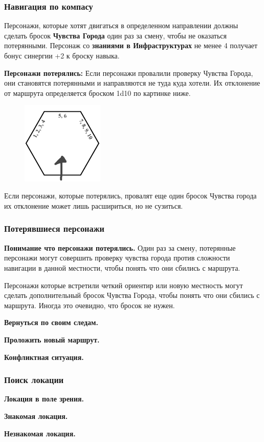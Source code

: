 \subsubsection*{Навигация по компасу}
Персонажи, которые хотят двигаться в определенном направлении должны сделать
бросок \textbf{Чувства Города} один раз за смену, чтобы не оказаться потерянными.
Персонаж со \textbf{знаниями в Инфраструктурах} не менее 4 получает бонус синергии +2 к броску навыка.

\textbf{Персонажи потерялись:} Если персонажи провалили проверку Чувства Города, они становятся
потерянными и направляются не туда куда хотели. Их отклонение от маршрута определяется броском 1d10 по
картинке ниже.

\begin{figure}[H]
  \centering
  \includegraphics*[width=0.35\textwidth]{./img/hex.pdf}
\end{figure}

Если персонажи, которые потерялись, провалят еще один бросок Чувства города их отклонение может лишь расшириться, но не сузиться.

\subsubsection*{Потерявшиеся персонажи}

\textbf{Понимание что персонажи потерялись.} Один раз за смену, потерянные персонажи могут совершить 
проверку чувства города против сложности навигации в данной местности, чтобы понять что они сбились с маршрута.

Персонажи которые встретили четкий ориентир или новую местность могут сделать дополнительный бросок
Чувства Города, чтобы понять что они сбились с маршрута. Иногда это очевидно, что бросок не нужен.

\textbf{Вернуться по своим следам.}

\textbf{Проложить новый маршрут.}

\textbf{Конфликтная ситуация.}

\subsubsection*{Поиск локации}
\textbf{Локация в поле зрения.}

\textbf{Знакомая локация.}

\textbf{Незнакомая локация.}




